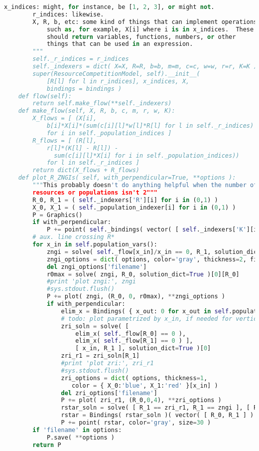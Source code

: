 \begin{lstlisting}[language=Python]
        x_indices: might, for instance, be [1, 2, 3], or might not.
        r_indices: likewise.
        X, R, b, etc: some kind of things that can implement operations
            such as, for example, X[i] where i is in x_indices.  These
            should return variables, functions, numbers, or other
            things that can be used in an expression.
        """
        self._r_indices = r_indices
        self._indexers = dict( X=X, R=R, b=b, m=m, c=c, w=w, r=r, K=K )
        super(ResourceCompetitionModel, self).__init__(
            [R[l] for l in r_indices], x_indices, X,
            bindings = bindings )
    def flow(self):
        return self.make_flow(**self._indexers)
    def make_flow(self, X, R, b, c, m, r, w, K):
        X_flows = [ (X[i],
            b[i]*X[i]*(sum(c[i][l]*w[l]*R[l] for l in self._r_indices) - m[i]))
            for i in self._population_indices ]
        R_flows = [ (R[l],
            r[l]*(K[l] - R[l]) -
              sum(c[i][l]*X[i] for i in self._population_indices))
            for l in self._r_indices ]
        return dict(X_flows + R_flows)
    def plot_R_ZNGIs( self, with_perpendicular=True, **options ):
        """This probably doesn't do anything helpful when the number of
        resources or populations isn't 2"""
        R_0, R_1 = ( self._indexers['R'][i] for i in (0,1) )
        X_0, X_1 = ( self._population_indexer[i] for i in (0,1) )
        P = Graphics()
        if with_perpendicular:
            P += point( self._bindings( vector( [ self._indexers['K'][i] for i in (0,1) ] ) ), color='gray', size=30 )
        # aux. line crossing R*
        for x_in in self.population_vars():
            zngi = solve( self._flow[x_in]/x_in == 0, R_1, solution_dict=True )[0][R_1]
            zngi_options = dict( options, color='gray', thickness=2, fill=True, fillcolor='gray', fillalpha=0.3, filename=None )
            del zngi_options['filename']
            r0max = solve( zngi, R_0, solution_dict=True )[0][R_0]
            #print 'plot zngi:', zngi
            #sys.stdout.flush()
            P += plot( zngi, (R_0, 0, r0max), **zngi_options )
            if with_perpendicular:
                elim_x = Bindings( { x_out: 0 for x_out in self.population_vars() if x_out != x_in } )
                # todo: plot parametrized by x_in, if needed for vertical case
                zri_soln = solve( [
                    elim_x( self._flow[R_0] == 0 ),
                    elim_x( self._flow[R_1] == 0 ) ],
                    [ x_in, R_1 ], solution_dict=True )[0]
                zri_r1 = zri_soln[R_1]
                #print 'plot zri:', zri_r1
                #sys.stdout.flush()
                zri_options = dict( options, thickness=1,
                   color = { X_0:'blue', X_1:'red' }[x_in] )
                del zri_options['filename']
                P += plot( zri_r1, (R_0,0,4), **zri_options )
                rstar_soln = solve( [ R_1 == zri_r1, R_1 == zngi ], [ R_0, R_1 ], solution_dict=True )[0]
                rstar = Bindings( rstar_soln )( vector( [ R_0, R_1 ] ) )
                P += point( rstar, color='gray', size=30 )
        if 'filename' in options:
            P.save( **options )
        return P


\end{lstlisting}
